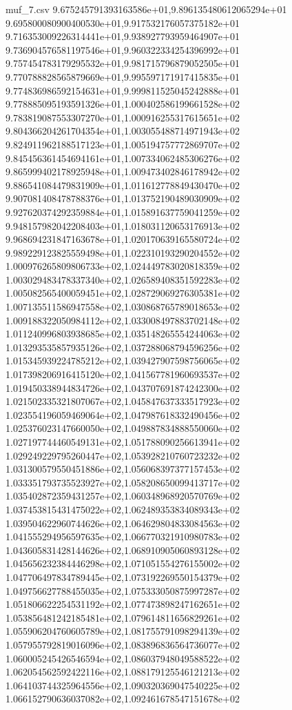 \begin{filecontents*}{muf_7.csv}
9.675245791393163586e+01,9.896135480612065294e+01
9.695800080900400530e+01,9.917532176057375182e+01
9.716353009226314441e+01,9.938927793959464907e+01
9.736904576581197546e+01,9.960322334254396992e+01
9.757454783179295532e+01,9.981715796879052505e+01
9.770788828565879669e+01,9.995597171917415835e+01
9.774836986592154631e+01,9.999811525045242888e+01
9.778885095193591326e+01,1.000402586199661528e+02
9.783819087553307270e+01,1.000916255317615651e+02
9.804366204261704354e+01,1.003055488714971943e+02
9.824911962188517123e+01,1.005194757772869707e+02
9.845456361454694161e+01,1.007334062485306276e+02
9.865999402178925948e+01,1.009473402846178942e+02
9.886541084479831909e+01,1.011612778849430470e+02
9.907081408478788376e+01,1.013752190489030909e+02
9.927620374292359884e+01,1.015891637759041259e+02
9.948157982042208403e+01,1.018031120653176913e+02
9.968694231847163678e+01,1.020170639165580724e+02
9.989229123825559498e+01,1.022310193290204552e+02
1.000976265809806733e+02,1.024449783020818359e+02
1.003029483478337340e+02,1.026589408351592283e+02
1.005082565400059451e+02,1.028729069276305381e+02
1.007135511586947558e+02,1.030868765789018653e+02
1.009188322050984112e+02,1.033008497883702148e+02
1.011240996803938685e+02,1.035148265554244063e+02
1.013293535857935126e+02,1.037288068794596256e+02
1.015345939224785212e+02,1.039427907598756065e+02
1.017398206916415120e+02,1.041567781960693537e+02
1.019450338944834726e+02,1.043707691874242300e+02
1.021502335321807067e+02,1.045847637333517923e+02
1.023554196059469064e+02,1.047987618332490456e+02
1.025376023147660050e+02,1.049887834888550060e+02
1.027197744460549131e+02,1.051788090256613941e+02
1.029249229795260447e+02,1.053928210760723232e+02
1.031300579550451886e+02,1.056068397377157453e+02
1.033351793735523927e+02,1.058208650099413717e+02
1.035402872359431257e+02,1.060348968920570769e+02
1.037453815431475022e+02,1.062489353834089343e+02
1.039504622960744626e+02,1.064629804833084563e+02
1.041555294956597635e+02,1.066770321910980783e+02
1.043605831428144626e+02,1.068910905060893128e+02
1.045656232384446298e+02,1.071051554276155002e+02
1.047706497834789445e+02,1.073192269550154379e+02
1.049756627788455035e+02,1.075333050875997287e+02
1.051806622254531192e+02,1.077473898247162651e+02
1.053856481242185481e+02,1.079614811656829261e+02
1.055906204760605789e+02,1.081755791098294139e+02
1.057955792819016096e+02,1.083896836564736077e+02
1.060005245426546594e+02,1.086037948049588522e+02
1.062054562592422116e+02,1.088179125546121213e+02
1.064103744325964556e+02,1.090320369047540225e+02
1.066152790636037082e+02,1.092461678547151678e+02

\end{filecontents*}
